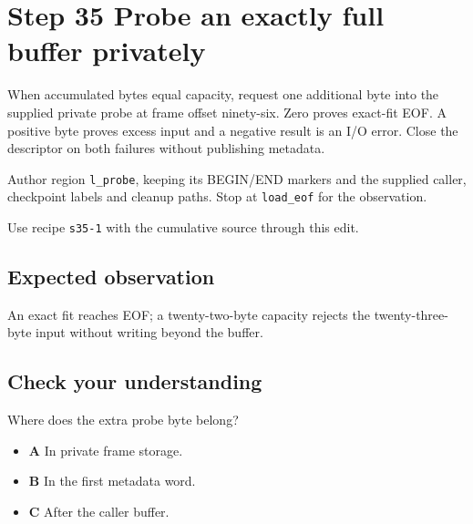 \section{Step 35 Probe an exactly full buffer privately}\label{ppm-s35}

When accumulated bytes equal capacity, request one additional byte into the supplied private probe at frame offset ninety-six. Zero proves exact-fit EOF. A positive byte proves excess input and a negative result is an I/O error. Close the descriptor on both failures without publishing metadata.

Author region \texttt{l\_probe}, keeping its BEGIN/END markers and the supplied caller, checkpoint labels and cleanup paths. Stop at \texttt{load\_eof} for the observation.

Use recipe \texttt{s35-1} with the cumulative source through this edit.

\subsection{Expected observation}
An exact fit reaches EOF; a twenty-two-byte capacity rejects the twenty-three-byte input without writing beyond the buffer.

\subsection{Check your understanding}
Where does the extra probe byte belong?

\begin{itemize}
\item \textbf{A} In private frame storage.
\item \textbf{B} In the first metadata word.
\item \textbf{C} After the caller buffer.
\end{itemize}
